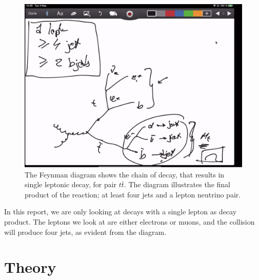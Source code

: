 \documentclass[12pt,a4paper]{article}
\numberwithin{equation}{section}
\begin{document}
\begin{figure}[H]
	\includegraphics[width=\linewidth]{figures/placeholder_feynman_singlelep.png}
	\caption{The Feynman diagram shows the chain of decay, that results in single
    leptonic decay, for pair $t\bar t$. The diagram illustrates the final
    product of the reaction; at least four jets and a lepton neutrino
    pair.}\label{fig:feynmandiagram}
\end{figure}

In this report, we are only looking at decays with a single lepton as decay
product. The leptons we look at are either electrons or muons, and the collision
will produce four jets, as evident from the diagram.

\section{Theory}
\end{document}
